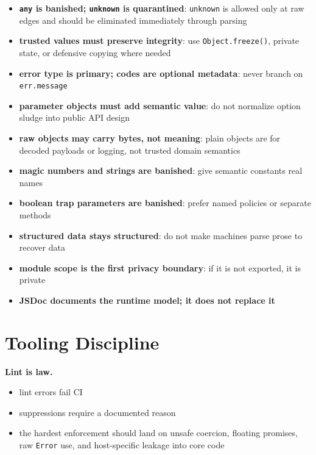 \begin{itemize}
\tightlist
\item
  \textbf{\texttt{a\allowbreak{}n\allowbreak{}y} is banished; \texttt{u\allowbreak{}n\allowbreak{}k\allowbreak{}n\allowbreak{}o\allowbreak{}w\allowbreak{}n} is quarantined}: \texttt{u\allowbreak{}n\allowbreak{}k\allowbreak{}n\allowbreak{}o\allowbreak{}w\allowbreak{}n} is allowed only at raw edges and should be eliminated immediately through parsing
\item
  \textbf{trusted values must preserve integrity}: use \texttt{O\allowbreak{}b\allowbreak{}j\allowbreak{}e\allowbreak{}c\allowbreak{}t\allowbreak{}.\allowbreak{}f\allowbreak{}r\allowbreak{}e\allowbreak{}e\allowbreak{}z\allowbreak{}e\allowbreak{}(\allowbreak{})}, private state, or defensive copying where needed
\item
  \textbf{error type is primary; codes are optional metadata}: never branch on \texttt{e\allowbreak{}r\allowbreak{}r\allowbreak{}.\allowbreak{}m\allowbreak{}e\allowbreak{}s\allowbreak{}s\allowbreak{}a\allowbreak{}g\allowbreak{}e}
\item
  \textbf{parameter objects must add semantic value}: do not normalize option sludge into public API design
\item
  \textbf{raw objects may carry bytes, not meaning}: plain objects are for decoded payloads or logging, not trusted domain semantics
\item
  \textbf{magic numbers and strings are banished}: give semantic constants real names
\item
  \textbf{boolean trap parameters are banished}: prefer named policies or separate methods
\item
  \textbf{structured data stays structured}: do not make machines parse prose to recover data
\item
  \textbf{module scope is the first privacy boundary}: if it is not exported, it is private
\item
  \textbf{JSDoc documents the runtime model; it does not replace it}
\end{itemize}

\section{Tooling Discipline}\label{record-060-tooling-discipline}

\textbf{Lint is law.}

\begin{itemize}
\tightlist
\item
  lint errors fail CI
\item
  suppressions require a documented reason
\item
  the hardest enforcement should land on unsafe coercion, floating promises, raw \texttt{E\allowbreak{}r\allowbreak{}r\allowbreak{}o\allowbreak{}r} use, and host-specific leakage into core code
\end{itemize}

